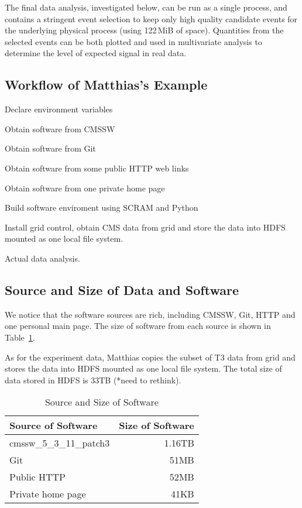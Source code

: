 \documentclass{acm_proc_article-sp}
\begin{document}
The final data analysis, investigated below, can be run as a single
process, and contains a stringent event selection to keep only high
quality candidate events for the underlying physical process (using
122$\,$MiB of space).  Quantities from the selected events can be
both plotted and used in multivariate analysis to determine the level
of expected signal in real data.


\subsection{Workflow of Matthias's Example}
Declare environment variables

Obtain software from CMSSW

Obtain software from Git

Obtain software from some public HTTP web links

Obtain software from one private home page

Build software enviroment using SCRAM and Python

Install grid control, obtain CMS data from grid and store the data into HDFS mounted as one local file system.

Actual data analysis.

\subsection{Source and Size of Data and Software}
We notice that the software sources are rich, including CMSSW, Git, HTTP and one personal main page. The size of software from each source is shown in Table~\ref{table:software-source-size}.

As for the experiment data, Matthias copies the subset of T3 data from grid and stores the data into HDFS mounted as one local file system. The total size of data stored in HDFS is 33TB (*need to rethink).

\begin{table}
    \centering
    \begin{tabular}{|l|r|}
        \hline
        Source of Software & Size of Software \\ \hline
        cmssw\_5\_3\_11\_patch3 & 1.16TB \\ \hline
        Git & 51MB \\ \hline
        Public HTTP & 52MB \\ \hline
        Private home page & 41KB \\ \hline
    \end{tabular}
    \caption{Source and Size of Software}
    \label{table:software-source-size}
\end{table}
\end{document}
